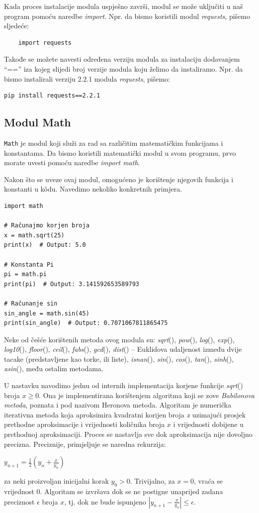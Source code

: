 Kada proces instalacije modula uspješno završi, modul se može uključiti u naš program pomoću naredbe \textit{import}. Npr. da bismo koristili modul \textit{requests}, pišemo sljedeće:
\begin{verbatim}
    import requests
\end{verbatim}
Takođe se možete navesti određena verziju modula za instalaciju dodavanjem  ``==''  iza kojeg slijedi broj verzije modula koju želimo da instaliramo. Npr. da bismo instalirali verziju 2.2.1 modula \textit{requests},  pišemo:
\begin{verbatim}
pip install requests==2.2.1
\end{verbatim}


\subsection{Modul Math}

\texttt{Math} je modul koji služi za rad sa različitim matematičkim funkcijama i konstantama. Da bismo koristili matematički modul u svom programu, prvo morate uvesti pomoću naredbe \textit{import math}.

Nakon što se uveze ovaj modul, omogućeno je korištenje njegovih funkcija i konstanti u k\^odu. Navedimo nekoliko konkretnih primjera. 

\begin{verbatim}
import math

# Računajmo korjen broja
x = math.sqrt(25)
print(x)  # Output: 5.0

# Konstanta Pi
pi = math.pi
print(pi)  # Output: 3.141592653589793

# Računanje sin 
sin_angle = math.sin(45)
print(sin_angle)  # Output: 0.7071067811865475
\end{verbatim}

Neke od češće korištenih metoda ovog modula su:   \textit{sqrt}(), \textit{pow}(), \textit{log}(), \textit{exp}(), \textit{log10}(), \textit{floor}(), \textit{ceil}(), \textit{fabs}(), \textit{gcd}(), \textit{dist}() – Euklidova udaljenost između dvije tacake (predstavljene kao torke, ili liste), \textit{isnan}(), \textit{sin}(), \textit{cos}(), \textit{tan}(), \textit{sinh}(), \textit{asin}(), među ostalim metodama.

U nastavku navodimo jednu od internih implementacija korjene funkcije \textit{sqrt}() broja $x\geq 0$. Ona je implementirana  korištenjem algoritma koji se zove \textit{Babilonova metoda}, poznata i pod nazivom Heronova metoda. Algoritam je numerička iterativna metoda koja aproksimira kvadratni korijen broja \textit{x} uzimajući prosjek prethodne aproksimacije i vrijednosti količnika broja $x$ i vrijednosti dobijene u prethodnoj aproksimaciji. Proces se nastavlja sve dok aproksimacija nije dovoljno precizna. Preciznije, primjeljuje se naredna rekurzija:
\begin{center}
	$y_{n+1}= \frac{1}{2}(y_n + \frac{x}{y_n})$
\end{center}
za neki proizvoljan inicijalni korak $y_0> 0$. Trivijalno, za $x=0$, vraća se vrijednost 0. Algoritam se izvršava dok se ne postigne unaprijed zadana preciznost $\epsilon$ broja $x$, tj. dok ne bude ispunjeno $|y_{n+1} - \frac{x}{y_n}| \leq \epsilon$. 
